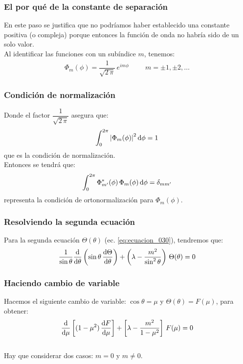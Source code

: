\documentclass[12pt]{beamer}
\begin{document}
\begin{frame}
\frametitle{El por qué de la constante de separación}
En este paso se justifica que no podríamos haber establecido una constante positiva (o compleja) porque entonces la función de onda no habría sido de un solo valor.
\\
\bigskip
\pause
Al identificar las funciones con un subíndice $m$, tenemos:
\begin{align}
    \Phi_{m}(\phi) = \dfrac{1}{\sqrt{2 \, \pi}} \, e^{i m \phi} \hspace{1cm} m = \pm 1, \pm 2, \ldots
    \label{eq:ecuacion_032}
\end{align}
\end{frame}
\begin{frame}
\frametitle{Condición de normalización}
Donde el factor $\dfrac{1}{\sqrt{2 \, \pi}}$ asegura que:
\begin{align*}
\int_{0}^{2 \pi} \abs{\Phi_{m}(\phi)}^{2} \dd{\phi} = 1
\end{align*}
que es la condición de normalización.
\\
\bigskip
\pause
Entonces se tendrá que:
\begin{align}
\int_{0}^{2 \pi} \Phi_{{m}^{\prime}}^{*}(\phi) \, \Phi_{m}(\phi) \dd{\phi} = \delta_{m {m}^{\prime}}
\label{eq:ecuacion_033}
\end{align}
representa la condición de ortonormalización para $\Phi_{m}(\phi)$.
\end{frame}
\begin{frame}
\frametitle{Resolviendo la segunda ecuación}
Para la segunda ecuación $\Theta (\theta)$ (ec. \ref{eq:ecuacion_030}), tendremos que:
\begin{align}
\dfrac{1}{\sin \theta} \dv{\theta} \left( \sin \theta \, \dv{\Theta}{\theta} \right) + \left( \lambda - \dfrac{m^{2}}{\sin^{2} \theta} \right) \, \Theta (\theta) = 0
\label{eq:ecuacion_034}
\end{align}
\end{frame}
\begin{frame}
\frametitle{Haciendo cambio de variable}
Hacemos el siguiente cambio de variable: $\cos \theta = \mu$ y $\Theta(\theta) = F(\mu)$, para obtener:
\begin{align}
\dv{\mu} \left[ (1 - \mu^{2}) \, \dv{F}{\mu} \right] + \left[ \lambda - \dfrac{m^{2}}{1 - \mu^{2}} \right] \, F(\mu) = 0
\label{eq:ecuacion_035}
\end{align}
\\
\bigskip
\pause
Hay que considerar dos casos: $m = 0$ y $m \neq 0$.
\end{frame}
\end{document}
